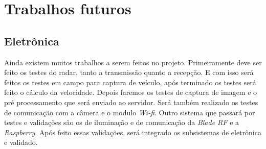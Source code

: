 \chapter{Trabalhos futuros}

\section{Eletrônica}

Ainda existem muitos trabalhos a serem feitos no projeto. Primeiramente deve ser feito os testes do radar, tanto a transmissão quanto a recepção. E com isso será feitos os testes em campo para captura de veículo, após terminado os testes será feito o cálculo da velocidade. Depois faremos os testes de captura de imagem e o pré processamento que será enviado ao servidor. Será também realizado os testes de comunicação com a câmera e o modulo \emph{Wi-fi}. Outro sistema que passará por testes e validações são os de iluminação e de comunicação da \emph{Blade RF} e a \emph{Raspberry}. Após feito essas validações, será integrado os subsistemas de eletrônica e validado.


